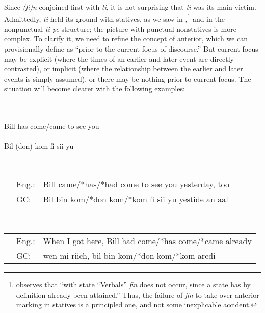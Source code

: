 Since \textit{(fi)n} conjoined first with \textit{ti}, it is not surprising that \textit{ti} was its main victim. Admittedly, \textit{ti} held its ground with statives, as we saw in ,\footnote{\citet{Corne1981} observes that ``with state ``Verbals'' \textit{fin} does not occur, since a state has by definition already been attained.'' Thus, the failure of \textit{fin} to take over anterior marking in statives is a principled one, and not some inexplicable accident.} and in the nonpunctual \textit{ti pe} structure; the picture with punctual nonstatives is more complex. To clarify it, we need to refine the concept of anterior, which we can provisionally define as ``prior to the current focus of discourse.'' But current focus may be explicit (where the times of an earlier and later event are directly contrasted), or implicit (where the relationship between the earlier and later events is simply assumed), or there may be nothing prior to current focus. The situation will become clearer with the following examples:


\ea\label{ex:2:103}
\\
\ea 
{}\\
Bill has come/came to see you\\
\ex 
{}\\
Bil (don) kom fi sii yu\\
\z
\z

\ea\label{ex:2:104}
\\
\begin{tabular}{lll}
& Eng.: & Bill came/*has/*had come to see you yesterday, too\\
& GC: & Bil bin kom/*don kom/*kom fi sii yu yestide an aal
\end{tabular}
\z


\ea\label{ex:2:105}
\\
\begin{tabular}{lll}
& Eng.: & When I got here, Bill had come/*has come/*came already\\
& GC: & wen mi riich, bil bin kom/*don kom/*kom aredi
\end{tabular}
\z


